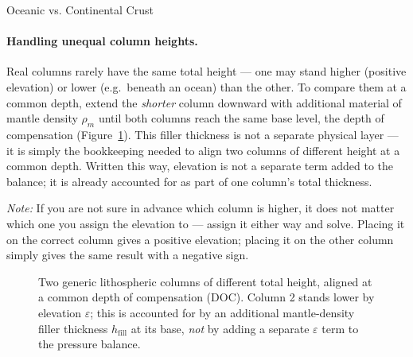 \begin{activity}{Oceanic vs. Continental Crust}
\paragraph{Handling unequal column heights.} Real columns rarely have the same total height --- one may stand higher (positive elevation) or lower (e.g.\ beneath an ocean) than the other. To compare them at a common depth, extend the \emph{shorter} column downward with additional material of mantle density $\rho_m$ until both columns reach the same base level, the depth of compensation (Figure~\ref{fig:general_balance}). This filler thickness is not a separate physical layer --- it is simply the bookkeeping needed to align two columns of different height at a common depth. Written this way, elevation is not a separate term added to the balance; it is already accounted for as part of one column's total thickness.

\emph{Note:} If you are not sure in advance which column is higher, it does not matter which one you assign the elevation to --- assign it either way and solve. Placing it on the correct column gives a positive elevation; placing it on the other column simply gives the same result with a negative sign.

\begin{figure}[h]
\centering
{}
\caption{Two generic lithospheric columns of different total height, aligned at a common depth of compensation (DOC). Column 2 stands lower by elevation $\varepsilon$; this is accounted for by an additional mantle-density filler thickness $h_{\mathrm{fill}}$ at its base, \emph{not} by adding a separate $\varepsilon$ term to the pressure balance.}
\label{fig:general_balance}
\end{figure}


\end{activity}
